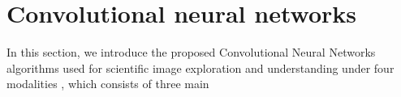 \section{Convolutional neural networks}
In this section, we introduce the proposed Convolutional Neural Networks algorithms used for scientific image exploration and understanding under four modalities
, which consists of three main
